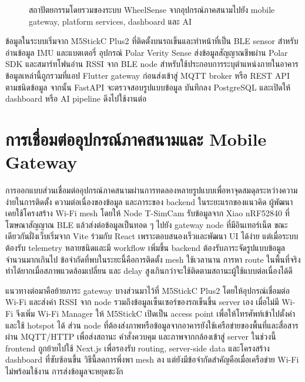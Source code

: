 \begin{figure}[!htbp]
{}
    \caption{สถาปัตยกรรมโดยรวมของระบบ WheelSense จากอุปกรณ์ภาคสนามไปยัง mobile gateway, platform services, dashboard และ AI}
    \label{fig:ch3-system-architecture}
\end{figure}

ข้อมูลในระบบเริ่มจาก M5StickC Plus2 ที่ติดตั้งบนรถเข็นและทำหน้าที่เป็น BLE sensor สำหรับอ่านข้อมูล IMU และแบตเตอรี่ อุปกรณ์ Polar Verity Sense ส่งข้อมูลสัญญาณชีพผ่าน Polar SDK และสมาร์ทโฟนอ่าน RSSI จาก BLE node สำหรับใช้ประกอบการระบุตำแหน่งภายในอาคาร ข้อมูลเหล่านี้ถูกรวมที่แอป Flutter gateway ก่อนส่งเข้าสู่ MQTT broker หรือ REST API ตามชนิดข้อมูล จากนั้น FastAPI จะตรวจสอบรูปแบบข้อมูล บันทึกลง PostgreSQL และเปิดให้ dashboard หรือ AI pipeline ดึงไปใช้งานต่อ

\section{การเชื่อมต่ออุปกรณ์ภาคสนามและ Mobile Gateway}
\label{sec:ch3_field_gateway}
การออกแบบส่วนเชื่อมต่ออุปกรณ์ภาคสนามผ่านการทดลองหลายรูปแบบเพื่อหาจุดสมดุลระหว่างความง่ายในการติดตั้ง ความต่อเนื่องของข้อมูล และภาระของ backend ในระยะแรกของแนวคิด ผู้พัฒนาเคยใช้โครงสร้าง Wi-Fi mesh โดยให้ Node T-SimCam รับข้อมูลจาก Xiao nRF52840 ที่โฆษณาสัญญาณ BLE แล้วส่งต่อข้อมูลเป็นทอด ๆ ไปยัง gateway node ที่มีอินเทอร์เน็ต ขณะเดียวกันฝั่งเว็บเริ่มจาก Vite ร่วมกับ React เพราะตอบสนองเร็วและพัฒนา UI ได้ง่าย แต่เมื่อระบบต้องรับ telemetry หลายชนิดและมี workflow เพิ่มขึ้น backend ต้องรับภาระจัดรูปแบบข้อมูลจำนวนมากเกินไป ข้อจำกัดที่พบในระยะนี้คือการติดตั้ง mesh ใช้เวลานาน การหา route ในพื้นที่จริงทำได้ยากเมื่อสภาพแวดล้อมเปลี่ยน และ delay สูงเกินกว่าจะใช้ติดตามสถานะผู้ใช้แบบต่อเนื่องได้ดี

แนวทางต่อมาคือย้ายภาระ gateway บางส่วนมาไว้ที่ M5StickC Plus2 โดยให้อุปกรณ์เชื่อมต่อ Wi-Fi และส่งค่า RSSI จาก node รวมถึงข้อมูลเซ็นเซอร์ของรถเข็นขึ้น server เอง เมื่อไม่มี Wi-Fi จึงเพิ่ม Wi-Fi Manager ให้ M5StickC เปิดเป็น access point เพื่อให้โทรศัพท์เข้าไปตั้งค่าและใช้ hotspot ได้ ส่วน node ที่ต้องส่งภาพหรือข้อมูลจากอาคารยังใช้เครือข่ายของพื้นที่และสื่อสารผ่าน MQTT/HTTP เพื่อส่งสถานะ คำสั่งควบคุม และภาพจากกล้องเข้าสู่ server ในช่วงนี้ frontend ถูกย้ายไปใช้ Next.js เพื่อรองรับ routing, server-side data และโครงสร้าง dashboard ที่ซับซ้อนขึ้น วิธีนี้ลดการพึ่งพา mesh ลง แต่ยังมีข้อจำกัดสำคัญคือเมื่อเครือข่าย Wi-Fi ไม่พร้อมใช้งาน การส่งข้อมูลจะหยุดชะงัก

